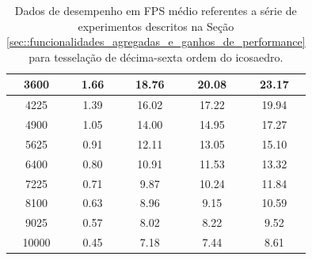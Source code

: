 \documentclass[
    12pt,                %
    oneside,            %
    a4paper,            %
    english,            %
    french,                %
    spanish,            %
    brazil                %
    ]{abntex2}
\begin{document}
\begin{apendicesenv}
\begin{table}[htb]
\begin{tabular}{c|c|c|c|c|}
\multicolumn{1}{|c|}{3600}      & 1.66                      & 18.76                     & 20.08                     & 23.17                    \\ \hline
\multicolumn{1}{|c|}{4225}      & 1.39                      & 16.02                     & 17.22                     & 19.94                    \\ \hline
\multicolumn{1}{|c|}{4900}      & 1.05                      & 14.00                     & 14.95                     & 17.27                    \\ \hline
\multicolumn{1}{|c|}{5625}      & 0.91                      & 12.11                     & 13.05                     & 15.10                    \\ \hline
\multicolumn{1}{|c|}{6400}      & 0.80                      & 10.91                     & 11.53                     & 13.32                    \\ \hline
\multicolumn{1}{|c|}{7225}      & 0.71                      & 9.87                      & 10.24                     & 11.84                    \\ \hline
\multicolumn{1}{|c|}{8100}      & 0.63                      & 8.96                      & 9.15                      & 10.59                    \\ \hline
\multicolumn{1}{|c|}{9025}      & 0.57                      & 8.02                      & 8.22                      & 9.52                     \\ \hline
\multicolumn{1}{|c|}{10000}     & 0.45                      & 7.18                      & 7.44                      & 8.61                     \\ \hline
\end{tabular}
\caption{Dados de desempenho em FPS médio referentes a série de experimentos descritos na Seção \ref{sec::funcionalidades_agregadas_e_ganhos_de_performance} para tesselação de décima-sexta ordem do icosaedro.}
\label{tab::testes_16}
\end{table}


\end{apendicesenv}
\end{document}

